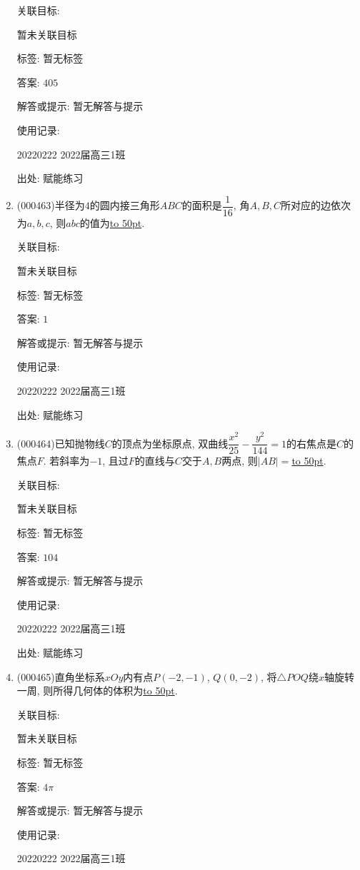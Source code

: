 \documentclass[10pt,a4paper]{article}
\newcommand{\blank}[1]{\underline{\hbox to #1pt{}}}
\begin{document}
\begin{enumerate}[1.]
关联目标:

暂未关联目标



标签: 暂无标签

答案: $405$

解答或提示: 暂无解答与提示

使用记录:

20220222	2022届高三1班	


出处: 赋能练习
\item { (000463)}半径为$4$的圆内接三角形$ABC$的面积是$\dfrac1{16}$, 角$A,B,C$所对应的边依次为$a,b,c$, 则$abc$的值为\blank{50}.


关联目标:

暂未关联目标



标签: 暂无标签

答案: $1$

解答或提示: 暂无解答与提示

使用记录:

20220222	2022届高三1班	


出处: 赋能练习
\item { (000464)}已知抛物线$C$的顶点为坐标原点, 双曲线$\dfrac{x^2}{25}-\dfrac{y^2}{144}=1$的右焦点是$C$的焦点$F$. 若斜率为$-1$, 且过$F$的直线与$C$交于$A,B$两点, 则$|AB|=$\blank{50}.


关联目标:

暂未关联目标



标签: 暂无标签

答案: $104$

解答或提示: 暂无解答与提示

使用记录:

20220222	2022届高三1班	


出处: 赋能练习
\item { (000465)}直角坐标系$xOy$内有点$P(-2,-1)$, $Q(0,-2)$, 将$\triangle POQ$绕$x$轴旋转一周, 则所得几何体的体积为\blank{50}.


关联目标:

暂未关联目标



标签: 暂无标签

答案: $4\pi$

解答或提示: 暂无解答与提示

使用记录:

20220222	2022届高三1班	


\end{enumerate}
\end{document}
